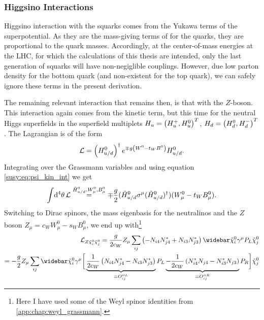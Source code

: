 \documentclass[../main.tex]{subfiles}
\begin{document}
\subsubsection*{Higgsino Interactions}
Higgsino interaction with the squarks comes from the Yukawa terms of the superpotential.
As they are the mass-giving terms of for the quarks, they are proportional to the quark masses.
Accordingly, at the center-of-mass energies at the LHC, for which the calculations of this thesis are intended, only the last generation of squarks will have non-negiglible couplings.
However, due low parton density for the bottom quark (and non-existent for the top quark), we can safely ignore these terms in the present derivation.

The remaining relevant interaction that remains then, is that with the \(Z\)-boson.
This interaction again comes from the kinetic term, but this time for the neutral
Higgs superfields in the superfield multiplets \(H_u = \left(H_u^+,
  H_u^0\right)^T\), \(H_d = \left(H_d^0, H_d^-\right)^T\). The Lagrangian is of the form
\begin{equation}
  \mathcal{L} = \left(H_{u/d}^0\right)^\dagger e^{\mp g\left(W^0 - t_W B^0\right)} H_{u/d}^0.
\end{equation}
Integrating over the Grassmann variables and using equation \cref{susy:eq:psi_kin_int} we get
\begin{equation}
  \integral{^4\theta} \L \stackrel{\tilde{H}_{u/d}^0, W^0_\mu, B^0_\mu}{=} \mp \frac{g}{2} (\tilde{H}_{u/d}^0 \sigma\^\mu (\tilde{H}_{u/d}^0)^\dagger) (W^0_\mu - t_W B_\mu^0).
\end{equation}
Switching to Dirac spinors, the mass eigenbasis for the neutralinos and the \(Z\) boson \(Z_\mu = c_W W^0_\mu - s_W B^0_\mu\), we end up with\footnote{Here I have used some of the Weyl spinor identities from \cref{app:chap:weyl_grassmann}.}
\begin{align}
  \label{susy:eq:Zneuneu-interaction-L}
  \nonumber
  \L_{Z \tilde\chi^0_i \tilde\chi^0_j} = \frac{g}{2c_W} Z_\mu \sum_{ij}\pclosed{-N_{i4}N_{j4}^\ast + N_{i3}N_{j3}^\ast} \barnino[i] \gamma^\mu P_L \nino[j] \\
  = -\frac{g}{2} Z_\mu \sum_{ij}\barnino[i] \gamma^\mu \bigg[ \underbrace{\frac{1}{2c_W}\pclosed{N_{i4}N_{j4}^\ast - N_{i3}N_{j3}^\ast}}_{\equiv O^{\prime\prime L}_{ij}} P_L \underbrace{-\frac{1}{2c_W}\pclosed{N_{i4}^\ast N_{j4} - N_{i3}^\ast N_{j3}}}_{\equiv O^{\prime\prime R}_{ij}} P_R \bigg] \nino[j]
\end{align}
\end{document}
